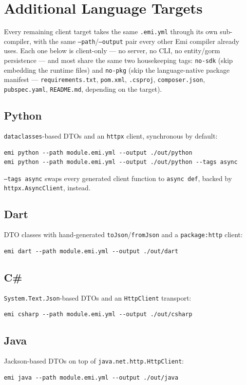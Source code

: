 \section{Additional Language Targets}
\label{sec:additional-targets}

Every remaining client target takes the same \texttt{.emi.yml} through
its own sub-compiler, with the same \texttt{--path}/\texttt{--output}
pair every other Emi compiler already uses. Each one below is
client-only --- no server, no CLI, no entity/gorm persistence --- and
most share the same two housekeeping tags: \texttt{no-sdk} (skip
embedding the runtime files) and \texttt{no-pkg} (skip the
language-native package manifest --- \texttt{requirements.txt},
\texttt{pom.xml}, \texttt{.csproj}, \texttt{composer.json},
\texttt{pubspec.yaml}, \texttt{README.md}, depending on the target).

\subsection{Python}
\texttt{dataclasses}-based DTOs and an \texttt{httpx} client, synchronous
by default:
\begin{lstlisting}
emi python --path module.emi.yml --output ./out/python
emi python --path module.emi.yml --output ./out/python --tags async
\end{lstlisting}
\texttt{--tags async} swaps every generated client function to
\texttt{async def}, backed by \texttt{httpx.AsyncClient}, instead.

\subsection{Dart}
DTO classes with hand-generated \texttt{toJson}/\texttt{fromJson} and a
\texttt{package:http} client:
\begin{lstlisting}
emi dart --path module.emi.yml --output ./out/dart
\end{lstlisting}

\subsection{C\#}
\texttt{System.Text.Json}-based DTOs and an \texttt{HttpClient} transport:
\begin{lstlisting}
emi csharp --path module.emi.yml --output ./out/csharp
\end{lstlisting}

\subsection{Java}
Jackson-based DTOs on top of \texttt{java.net.http.HttpClient}:
\begin{lstlisting}
emi java --path module.emi.yml --output ./out/java
\end{lstlisting}

